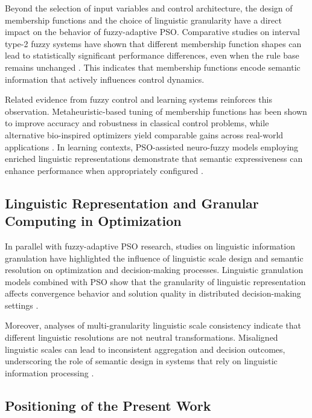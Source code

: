 \documentclass[runningheads]{llncs}
\begin{document}
Beyond the selection of input variables and control architecture, the design of membership functions and the choice of linguistic granularity have a direct impact on the behavior of fuzzy-adaptive PSO. Comparative studies on interval type-2 fuzzy systems have shown that different membership function shapes can lead to statistically significant performance differences, even when the rule base remains unchanged \cite{olivas2014comparative}. This indicates that membership functions encode semantic information that actively influences control dynamics.

Related evidence from fuzzy control and learning systems reinforces this observation. Metaheuristic-based tuning of membership functions has been shown to improve accuracy and robustness in classical control problems, while alternative bio-inspired optimizers yield comparable gains across real-world applications \cite{fierro2013optimization,nikolic2020bee}. In learning contexts, PSO-assisted neuro-fuzzy models employing enriched linguistic representations demonstrate that semantic expressiveness can enhance performance when appropriately configured \cite{chatterjee2007pso}.

\vspace{-0.25cm}
\subsection{Linguistic Representation and Granular Computing in Optimization}

In parallel with fuzzy-adaptive PSO research, studies on linguistic information granulation have highlighted the influence of linguistic scale design and semantic resolution on optimization and decision-making processes. Linguistic granulation models combined with PSO show that the granularity of linguistic representation affects convergence behavior and solution quality in distributed decision-making settings \cite{huang2022linguistic,zhang2022linguistic}.

Moreover, analyses of multi-granularity linguistic scale consistency indicate that different linguistic resolutions are not neutral transformations. Misaligned linguistic scales can lead to inconsistent aggregation and decision outcomes, underscoring the role of semantic design in systems that rely on linguistic information processing \cite{zhao2021linguistic}.

\vspace{-0.25cm}
\subsection{Positioning of the Present Work}
\end{document}
